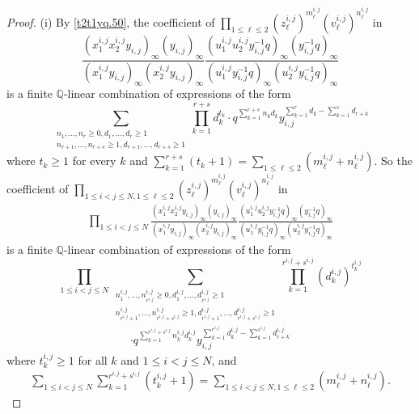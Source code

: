\documentclass[12pt, reqno]{amsart}
\theoremstyle{definition}
\theoremstyle{remark}
\numberwithin{equation}{section}
\newcommand{\Q}{ \mathbb Q }
\numberwithin{equation}{section}
\begin{document}
\begin{proof}
(i) By \eqref{t2t1yq.50}, the coefficient of 
$\prod_{1 \le \ell \le 2} (z_\ell^{i,j})^{m_\ell^{i,j}}
(v_\ell^{i,j})^{n_\ell^{i,j}}$ in 
$$
\frac{(x_1^{i,j}x_2^{i,j}y_{i,j})_\infty (y_{i,j})_\infty}
     {(x_1^{i,j}y_{i,j})_\infty (x_2^{i,j}y_{i,j})_\infty} 
   \frac{(u_1^{i,j}u_2^{i,j}y_{i,j}^{-1}q)_\infty (y_{i,j}^{-1}q)_\infty}
     {(u_1^{i,j}y_{i,j}^{-1}q)_\infty (u_2^{i,j}y_{i,j}^{-1}q)_\infty}
$$
is a finite $\Q$-linear combination of expressions of the form
$$ 
\sum_{\substack{n_1, \ldots, n_r \ge 0, d_1, \ldots, d_r \ge 1\\
    n_{r+1}, \ldots, n_{r+s} \ge 1, d_{r+1}, \ldots, d_{r+s} \ge 1}}
  \prod_{k=1}^{r+s} d_k^{t_k} 
  \cdot q^{\sum_{k=1}^{r+s} n_k d_k}
  y_{i,j}^{\sum_{k=1}^r d_k - \sum_{k=1}^{s} d_{r+k}}
$$
where $t_k \ge 1$ for every $k$ and $\sum_{k=1}^{r+s} (t_{k} +1) 
= \sum_{1 \le \ell \le 2} (m_\ell^{i,j} + n_\ell^{i,j})$. 
So the coefficient of $\prod_{1 \le i < j \le N, 1 \le \ell \le 2} 
(z_\ell^{i,j})^{m_\ell^{i,j}}(v_\ell^{i,j})^{n_\ell^{i,j}}$ in 
\begin{eqnarray}    \label{yij1toNm>0.99}
\prod_{1 \le i < j \le N} 
   \frac{(x_1^{i,j}x_2^{i,j}y_{i,j})_\infty (y_{i,j})_\infty}
     {(x_1^{i,j}y_{i,j})_\infty (x_2^{i,j}y_{i,j})_\infty} 
   \frac{(u_1^{i,j}u_2^{i,j}y_{i,j}^{-1}q)_\infty (y_{i,j}^{-1}q)_\infty}
     {(u_1^{i,j}y_{i,j}^{-1}q)_\infty (u_2^{i,j}y_{i,j}^{-1}q)_\infty}
\end{eqnarray}
is a finite $\Q$-linear combination of expressions of the form
$$ 
\prod_{1 \le i < j \le N}
\sum_{\substack{n_1^{i,j}, \ldots, n_{r^{i,j}}^{i,j} \ge 0, 
    d_1^{i,j}, \ldots, d_{r^{i,j}}^{i,j} \ge 1\\
    n_{r^{i,j}+1}^{i,j}, \ldots, n_{r^{i,j}+s^{i,j}}^{i,j} \ge 1, 
    d_{r^{i,j}+1}^{i,j}, \ldots, d_{r^{i,j}+s^{i,j}}^{i,j} \ge 1}}
  \prod_{k=1}^{r^{i,j}+s^{i,j}} (d_k^{i,j})^{t_k^{i,j}} 
$$
\begin{eqnarray}    \label{yij1toNm>0.100}
\cdot q^{\sum_{k=1}^{r^{i,j}+s^{i,j}} n_k^{i,j} d_k^{i,j}}
  y_{i,j}^{\sum_{k=1}^{r^{i,j}} d_k^{i,j} 
    - \sum_{k=1}^{s^{i,j}} d_{r+k}^{i,j}}
\end{eqnarray}
where $t_k^{i,j} \ge 1$ for all $k$ and $1 \le i < j \le N$, and
\begin{eqnarray}    \label{yij1toNm>0.101}
  \sum_{1 \le i < j \le N} \sum_{k=1}^{r^{i,j}+s^{i,j}} (t_k^{i,j} +1)
= \sum_{1 \le i < j \le N, 1 \le \ell \le 2} 
   (m_\ell^{i,j} + n_\ell^{i,j}).
\end{eqnarray}


\end{proof}
\end{document}
